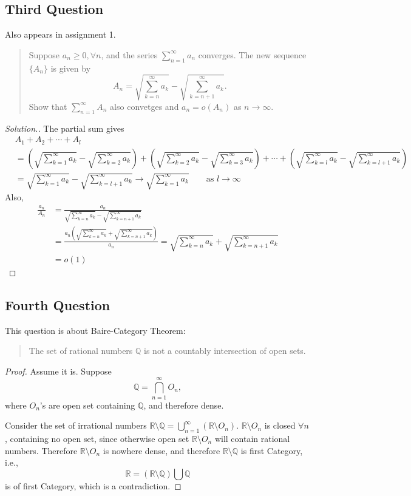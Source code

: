 \subsection{Third Question}
Also appears in assignment 1. 
\begin{quotation}
Suppose $a_n\ge0,\forall n$, and the series $\sum_{n=1}^\infty a_n$ converges. The new sequence $\{A_n\}$ is given by
\[
A_n=\sqrt{\sum_{k=n}^\infty a_k} - \sqrt{\sum_{k=n+1}^\infty a_k}.
\]
Show that $\sum_{n=1}^\infty A_n$ also convetges and $a_n=o(A_n)$ as $n\to\infty$.
\end{quotation}
\begin{proof}[Solution.]
The partial sum gives
\begin{align*}
&A_1+A_2+\cdots+A_l\\
&=
(\sqrt{\sum_{k=1}^\infty a_k} - \sqrt{\sum_{k=2}^\infty a_k})
+
(\sqrt{\sum_{k=2}^\infty a_k} - \sqrt{\sum_{k=3}^\infty a_k})
+\cdots+(\sqrt{\sum_{k=l}^\infty a_k} - \sqrt{\sum_{k=l+1}^\infty a_k})\\
&=\sqrt{\sum_{k=1}^\infty a_k} - \sqrt{\sum_{k=l+1}^\infty a_k}\to\sqrt{\sum_{k=1}^\infty a_k}\qquad \mbox{as }l\to\infty
\end{align*}
Also,
\begin{align*}
\frac{a_n}{A_n}&=\frac{a_n}{\sqrt{\sum_{k=n}^\infty a_k} -\sqrt{\sum_{k=n+1}^\infty a_k}}\\
&=\frac{a_n(\sqrt{\sum_{k=n}^\infty a_k} +\sqrt{\sum_{k=n+1}^\infty a_k})}{a_n}=\sqrt{\sum_{k=n}^\infty a_k} +\sqrt{\sum_{k=n+1}^\infty a_k}\\
&=o(1)
\end{align*}
\end{proof}



\subsection{Fourth Question}
This question is about Baire-Category Theorem: 
\begin{quotation}
The set of rational numbers $\mathbb{Q}$ is not a countably intersection of open sets.
\end{quotation}
\begin{proof}
Assume it is. Suppose
\[
\mathbb{Q}=\bigcap_{n=1}^\infty O_n,
\]
where $O_n$'s are open set containing $\mathbb{Q}$, and therefore dense. 

Consider the set of irrational numbers $\mathbb{R}\setminus \mathbb{Q}=\bigcup_{n=1}^\infty(\mathbb{R}\setminus O_n)$. $\mathbb{R}\setminus O_n$ is closed $\forall n$, containing no open set, since otherwise open set $\mathbb{R}\setminus O_n$ will contain rational numbers. Therefore $\mathbb{R}\setminus O_n$ is nowhere dense, and therefore $\mathbb{R}\setminus \mathbb{Q}$ is first Category, i.e.,
\[
\mathbb{R}=(\mathbb{R}\setminus\mathbb{Q})\bigcup\mathbb{Q}
\]
is of first Category, which is a contradiction.
\end{proof}

